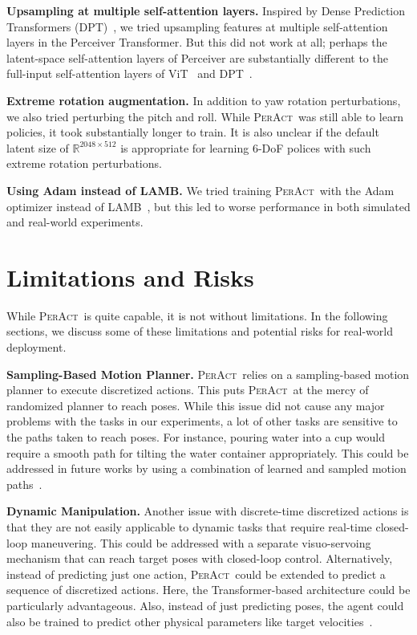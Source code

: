 \documentclass{article}
\newcommand{\model}{\textsc{PerAct}}
\begin{document}
\textbf{Upsampling at multiple self-attention layers.} Inspired by Dense Prediction Transformers (DPT)~\citep{ranftl2021vision}, we tried upsampling features at multiple self-attention layers in the Perceiver Transformer. But this did not work at all; perhaps the latent-space self-attention layers of Perceiver are substantially different to the full-input self-attention layers of ViT~\citep{dosovitskiy2020image} and DPT~\citep{ranftl2021vision}.

\textbf{Extreme rotation augmentation.} In addition to yaw rotation perturbations, we also tried perturbing the pitch and roll. While \model~was still able to learn policies, it took substantially longer to train. It is also unclear if the default latent size of $\mathbb{R}^{2048 \times 512}$ is appropriate for learning 6-DoF polices with such extreme rotation perturbations. 

\textbf{Using Adam instead of LAMB.} We tried training \model~with the Adam~\citep{kingma2014adam} optimizer instead of LAMB~\citep{you2019large}, but this led to worse performance in both simulated and real-world experiments. 
\vspace{-0.1cm}
\section{Limitations and Risks} \label{app:limitations}
\vspace{-0.1cm}
While \model~is quite capable, it is not without limitations. In the following sections, we discuss some of these limitations and potential risks for real-world deployment. 

\textbf{Sampling-Based Motion Planner.} \model~relies on a sampling-based motion planner to execute discretized actions. This puts \model~at the mercy of randomized planner to reach poses. While this issue did not cause any major problems with the tasks in our experiments, a lot of other tasks are sensitive to the paths taken to reach poses. For instance, pouring water into a cup would require a smooth path for tilting the water container appropriately. This could be addressed in future works by using a combination of learned and sampled motion paths~\citep{james2022coarse}.

\textbf{Dynamic Manipulation.} Another issue with discrete-time discretized actions is that they are not easily applicable to dynamic tasks that require real-time closed-loop maneuvering. This could be addressed with a separate visuo-servoing mechanism that can reach target poses with closed-loop control. Alternatively, instead of predicting just one action, \model~could be extended to predict a sequence of discretized actions. Here, the Transformer-based architecture could be particularly advantageous. Also, instead of just predicting poses, the agent could also be trained to predict other physical parameters like target velocities~\citep{zeng2020tossingbot}.
\end{document}
